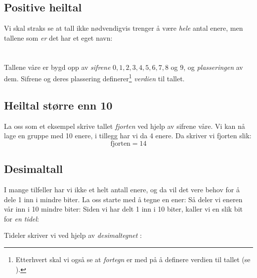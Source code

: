 \subsection*{Positive heiltal}
Vi skal straks se at tall ikke nødvendigvis trenger å være \textsl{hele} antal enere, men tallene som \textsl{er} det har et eget navn:\regv


\newpage
\section{\talsifverd}
Tallene våre er bygd opp av \textit{sifrene} $ 0, 1, 2 , 3, 4, 5, 6, 7, 8 $ og $ 9 $, og \textsl{plasseringen} av dem. Sifrene og deres plassering definerer\footnote{Etterhvert skal vi også se at \textit{fortegn} er med på å definere verdien til tallet (se ).} \textit{verdien}  til tallet.
\subsection*{Heiltal større enn 10}
La oss som et eksempel skrive tallet \textsl{fjorten} ved hjelp av sifrene våre.
Vi kan nå lage en gruppe med 10 enere, i tillegg har vi da 4 enere. Da skriver vi fjorten slik:
\[ \text{fjorten}=14 \]
\vsk

\newpage
\subsection*{Desimaltall}
I mange tilfeller har vi ikke et helt antall enere, og da vil det vere behov for å dele 1 inn i mindre biter. La oss starte med å tegne en ener:
Så deler vi eneren vår inn i 10 mindre biter:
Siden vi har delt 1 inn i 10 biter, kaller vi en slik bit for \textit{en tidel}:
\begin{comment}
\eks{\vs
	\fig{maal2}
	\fig{des2}
}\vsk
\end{comment}
Tideler skriver vi ved hjelp av  \textit{desimaltegnet} \sym{,}  :
\regv
{}
\newpage
